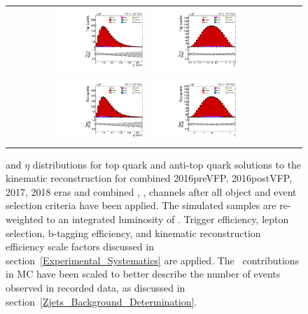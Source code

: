 \begin{figure}[htb]
    \begin{center}
        \begin{tabular}{cc}
            \includegraphics[width=0.325\textwidth]{fig_fullRun2UL/controlplots/combined/HypToppT.pdf}
            \includegraphics[width=0.325\textwidth]{fig_fullRun2UL/controlplots/combined/HypTopRapidity.pdf} \\
            \includegraphics[width=0.325\textwidth]{fig_fullRun2UL/controlplots/combined/HypAntiToppT.pdf}
            \includegraphics[width=0.325\textwidth]{fig_fullRun2UL/controlplots/combined/HypAntiTopRapidity.pdf} 
        \end{tabular}
        \caption{\footnotesize \pT and $\eta$ distributions for top quark and anti-top quark solutions to the kinematic reconstruction for combined 2016preVFP, 2016postVFP, 2017, 2018 eras and combined \ee, \emu, \mumu channels after all object and event selection criteria have been applied.
        The simulated samples are re-weighted to an integrated luminosity of \lumivalueRuniiUL.
        Trigger efficiency, lepton selection, b-tagging efficiency, and kinematic reconstruction efficiency scale factors discussed in section~\ref{Experimental_Systematics} are applied.
        The \zjets\ contributions in MC have been scaled to better describe the number of events observed in recorded data, as discussed in section~\ref{Zjets_Background_Determination}.
        }
    \end{center}
\end{figure}

